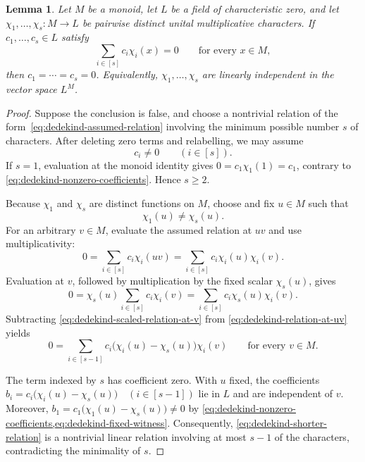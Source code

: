 \documentclass[11pt,letterpaper,onecolumn]{article}
\theoremstyle{plain}
\newtheorem{lemma}[lemma]{Lemma}
\theoremstyle{definition}
\theoremstyle{remark}
\begin{document}
\begin{lemma}
\label{lem:dedekind-independence}
Let $M$ be a monoid, let $L$ be a field of characteristic zero, and let $\chi_1,\ldots,\chi_s:M\to L$ be pairwise distinct unital multiplicative characters.  If
$c_1,\ldots,c_s\in L$ satisfy
\begin{equation}
  \sum_{i\in[s]} c_i\chi_i(x)=0
  \qquad\text{for every }x\in M,
  \label{eq:dedekind-assumed-relation}
\end{equation}
then $c_1=\cdots=c_s=0$.  Equivalently,
$\chi_1,\ldots,\chi_s$ are linearly independent in the vector space $L^M$.
\end{lemma}

\begin{proof}

Suppose the conclusion is false, and choose a nontrivial relation of the
form~\eqref{eq:dedekind-assumed-relation} involving the minimum possible
number $s$ of characters.  After deleting zero terms and relabelling, we may
assume
\begin{equation}
  c_i\ne0
  \qquad(i\in[s]).
  \label{eq:dedekind-nonzero-coefficients}
\end{equation}
If $s=1$, evaluation at the monoid identity gives $0=c_1\chi_1(1)=c_1$, contrary to \eqref{eq:dedekind-nonzero-coefficients}.  Hence $s\ge2$.

Because $\chi_1$ and $\chi_s$ are distinct functions on $M$, choose and fix
$u\in M$ such that
\begin{equation}
  \chi_1(u)\ne\chi_s(u).
  \label{eq:dedekind-fixed-witness}
\end{equation}
For an arbitrary $v\in M$, evaluate the assumed relation at $uv$ and use
multiplicativity:
\begin{equation}
  0=\sum_{i\in[s]}c_i\chi_i(uv)
   =\sum_{i\in[s]}c_i\chi_i(u)\chi_i(v).
  \label{eq:dedekind-relation-at-uv}
\end{equation}
Evaluation at $v$, followed by multiplication by the fixed scalar
$\chi_s(u)$, gives
\begin{equation}
  0
  =\chi_s(u)\sum_{i\in[s]} c_i\chi_i(v)
  =\sum_{i\in[s]} c_i\chi_s(u)\chi_i(v).
  \label{eq:dedekind-scaled-relation-at-v}
\end{equation}
Subtracting \eqref{eq:dedekind-scaled-relation-at-v} from
\eqref{eq:dedekind-relation-at-uv} yields
\begin{equation}
  0=\sum_{i\in[s-1]}
      c_i\bigl(\chi_i(u)-\chi_s(u)\bigr)\chi_i(v)
  \qquad\text{for every }v\in M.
  \label{eq:dedekind-shorter-relation}
\end{equation}

The term indexed by $s$ has coefficient zero.  With $u$ fixed, the
coefficients $b_i=c_i\bigl(\chi_i(u)-\chi_s(u)\bigr) \quad(i\in[s-1])$
lie in $L$ and are independent of $v$.  Moreover,
$b_1=c_1\bigl(\chi_1(u)-\chi_s(u)\bigr)\ne0$ by
\cref{eq:dedekind-nonzero-coefficients,eq:dedekind-fixed-witness}.
Consequently, \eqref{eq:dedekind-shorter-relation} is a nontrivial linear
relation involving at most $s-1$ of the characters, contradicting the
minimality of $s$.
\end{proof}
\end{document}
